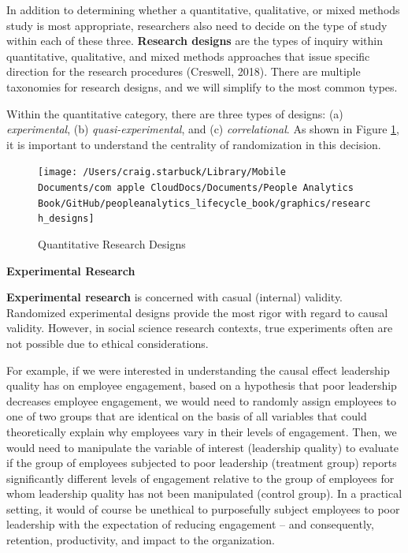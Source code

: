 \documentclass[]{book}
\begin{document}
In addition to determining whether a quantitative, qualitative, or mixed methods study is most appropriate, researchers also need to decide on the type of study within each of these three. \textbf{Research designs} are the types of inquiry within quantitative, qualitative, and mixed methods approaches that issue specific direction for the research procedures (Creswell, 2018). There are multiple taxonomies for research designs, and we will simplify to the most common types.

Within the quantitative category, there are three types of designs: (a) \emph{experimental}, (b) \emph{quasi-experimental}, and (c) \emph{correlational}. As shown in Figure \ref{fig:res-designs}, it is important to understand the centrality of randomization in this decision.

\begin{figure}

{\centering \texttt{[image: /Users/craig.starbuck/Library/Mobile Documents/com~apple~CloudDocs/Documents/People Analytics Book/GitHub/peopleanalytics\_lifecycle\_book/graphics/research\_designs]} 

}

\caption{Quantitative Research Designs}\label{fig:res-designs}
\end{figure}

\textbf{Experimental Research}

\textbf{Experimental research} is concerned with casual (internal) validity. Randomized experimental designs provide the most rigor with regard to causal validity. However, in social science research contexts, true experiments often are not possible due to ethical considerations.

For example, if we were interested in understanding the causal effect leadership quality has on employee engagement, based on a hypothesis that poor leadership decreases employee engagement, we would need to randomly assign employees to one of two groups that are identical on the basis of all variables that could theoretically explain why employees vary in their levels of engagement. Then, we would need to manipulate the variable of interest (leadership quality) to evaluate if the group of employees subjected to poor leadership (treatment group) reports significantly different levels of engagement relative to the group of employees for whom leadership quality has not been manipulated (control group). In a practical setting, it would of course be unethical to purposefully subject employees to poor leadership with the expectation of reducing engagement -- and consequently, retention, productivity, and impact to the organization.
\end{document}
